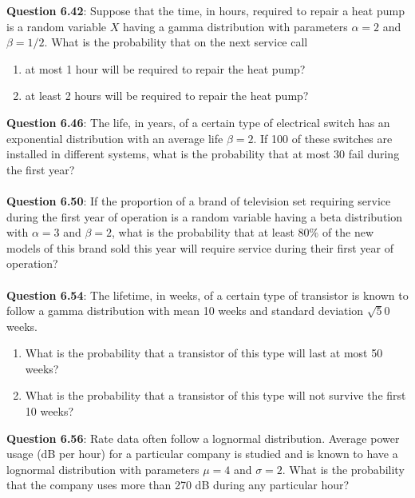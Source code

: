 \documentclass{article}
\begin{document}
    \noindent\textbf{Question 6.42}: Suppose that the time, in hours, required to
    repair a heat pump is a random variable $X$ having a gamma distribution 
    with parameters $\alpha = 2$ and $\beta = 1/2$. What is the probability 
    that on the next service call
        \begin{enumerate}[label = (\alph*) ]
            \item at most 1 hour will be required to repair the heat pump?
            \item at least 2 hours will be required to repair the heat pump?
        \end{enumerate}

    \noindent\textbf{Question 6.46}: The life, in years, of a certain type of electrical
    switch has an exponential distribution with an average life $\beta = 2$. If 100 of 
    these switches are installed in different systems, what is the probability that at 
    most 30 fail during the first year?\\\\
    
    \noindent\textbf{Question 6.50}: If the proportion of a brand of television set 
    requiring service during the first year of operation is a random variable having 
    a beta distribution with $\alpha = 3$ and $\beta = 2$, what is the probability 
    that at least 80\% of the new models of this brand sold this year will require
    service during their first year of operation?\\\\
    
    \noindent\textbf{Question 6.54}: The lifetime, in weeks, of a certain type of 
    transistor is known to follow a gamma distribution with mean 10 weeks and standard 
    deviation $\sqrt50$ weeks.
        \begin{enumerate}[label = (\alph*) ]
            \item What is the probability that a transistor of this type will last at 
            most 50 weeks?
            \item  What is the probability that a transistor of this type will not 
            survive the first 10 weeks?
        \end{enumerate}
    
    \noindent\textbf{Question 6.56}: Rate data often follow a lognormal distribution.
    Average power usage (dB per hour) for a particular company is studied and is known 
    to have a lognormal distribution with parameters $\mu = 4$ and $\sigma = 2$. What
    is the probability that the company uses more than 270 dB during any particular hour?\\\\
    
\end{document}
